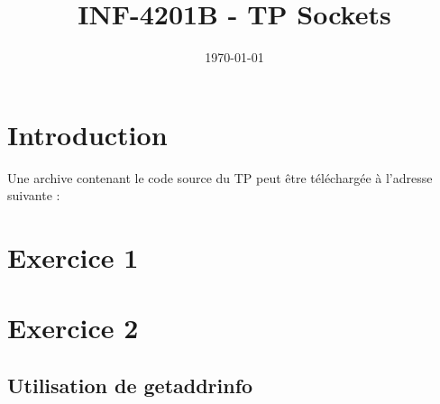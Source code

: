 \documentclass[a4paper, frenchb, 11pt]{article}
\title{
	\textbf{INF-4201B - TP Sockets}\\
}
\date{\today}
\begin{document}
\maketitle
\newpage


\section*{Introduction}

\begin{mdframed}[backgroundcolor=lightblue, linecolor=darkblue]
	Une archive contenant le code source du TP peut être téléchargée à l'adresse
	suivante : %
\end{mdframed}
\newpage

\section*{Exercice 1}



\newpage

\section*{Exercice 2}

\subsection*{Utilisation de getaddrinfo}
\end{document}
